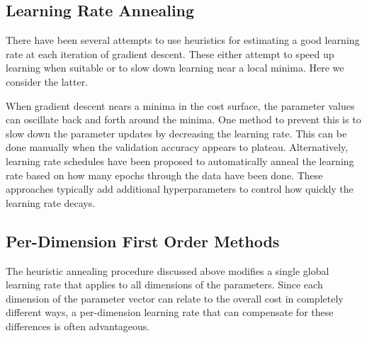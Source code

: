 \documentclass{article}
\begin{document}
\subsection{Learning Rate Annealing}
There have been several attempts to use heuristics for estimating a good learning rate at each
iteration of gradient descent. These either attempt to speed up learning when suitable or to slow
down learning near a local minima. Here we consider the latter.

When gradient descent nears a minima in the cost surface, the parameter values can oscillate back
and forth around the minima. One method to prevent this is to
slow down the parameter updates by decreasing the learning rate. This can be done manually when the
validation accuracy appears to plateau. Alternatively, learning rate schedules have been proposed
\cite{robbins51} to automatically anneal the learning rate based on how many epochs through the data
have been done. These approaches typically add additional hyperparameters to control how quickly the
learning rate decays.

\subsection{Per-Dimension First Order Methods}
The heuristic annealing procedure discussed above modifies a single global learning rate that applies to
all dimensions of the parameters. Since each dimension of the parameter vector can relate to the
overall cost in completely different ways, a per-dimension learning rate that can compensate for
these differences is often advantageous.
\end{document}
